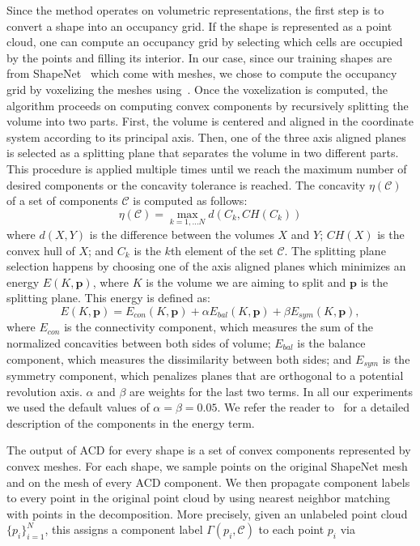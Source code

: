 \vspace{2mm}
 Since the method operates on volumetric representations,
the first step is to convert a shape into an occupancy grid.
If the shape is represented as a point cloud, one can compute an occupancy grid by
selecting which cells are occupied by the points and filling its interior.
In our case, since our training shapes are from ShapeNet~\cite{Chang2015ShapeNetAI} which come with meshes, we chose to compute the occupancy grid by voxelizing the meshes using~\cite{voxelizer}.
Once the voxelization is computed, the algorithm proceeds on computing convex components by
recursively splitting the volume into two parts.
First, the volume is centered and aligned in the coordinate system according to its principal
axis.
Then, one of the three axis aligned planes is selected as a splitting plane that
separates the volume in two different parts.
This procedure is applied multiple times until we reach the maximum number of desired components
or the concavity tolerance is reached.
The concavity $\eta(\mathcal{C})$ of a set of components $\mathcal{C}$ is computed as follows:
\begin{equation}
\eta(\mathcal{C}) = \max_{k=1,...N}d(C_k, CH(C_k))
\end{equation}
where $d(X,Y)$ is the difference between the volumes $X$ and $Y$;
$CH(X)$ is the convex hull of $X$;
and $C_k$ is the $k$th element of the set $\mathcal{C}$.
The splitting plane selection happens by choosing one of the axis aligned planes which minimizes an energy $E(K, \mathbf{p})$,
where $K$ is the volume we are aiming to split and $\mathbf{p}$ is the splitting plane.
This energy is defined as:
\begin{equation}
    E(K, \mathbf{p}) = E_{con}(K, \mathbf{p}) + \alpha E_{bal}(K, \mathbf{p}) + \beta E_{sym}(K, \mathbf{p}),
\end{equation}
where $E_{con}$ is the connectivity component, which measures the sum of the normalized concavities between both sides of volume;
$E_{bal}$ is the balance component, which measures the dissimilarity between both sides;
and $E_{sym}$ is the symmetry component, which penalizes planes that are orthogonal to a potential revolution axis.
$\alpha$ and $\beta$ are weights for the last two terms.
In all our experiments we used the default values of $\alpha = \beta = 0.05$.
We refer the reader to~\cite{vhacd} for a detailed description of the components in the energy term.

\vspace{2mm}
The output of ACD for every shape is a set of convex components represented by convex meshes.
For each shape, we sample points on the original ShapeNet mesh and on the mesh of every ACD component.
We then propagate component labels to every point in the original point cloud by using
nearest neighbor matching with points in the decomposition. 
%
More precisely, given an unlabeled point cloud $\{ p_i \}_{i=1}^{N}$, this assigns a component 
label $\Gamma(p_i, \mathcal{C})$ to each point $p_i$ via


